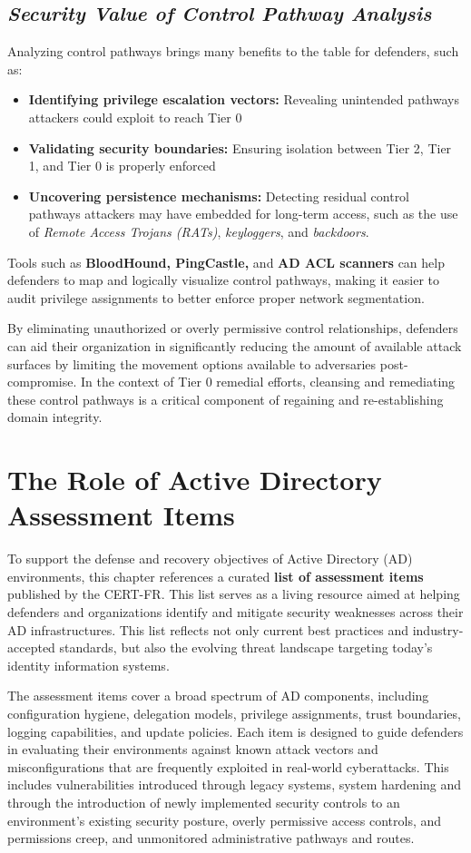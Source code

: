 \subsection{\textit{Security Value of Control Pathway Analysis}}
Analyzing control pathways brings many benefits to the table for defenders, such as:
\begin{itemize}
    \item \textbf{Identifying privilege escalation vectors:} Revealing unintended pathways attackers could exploit to reach Tier 0
        \item \textbf{Validating security boundaries:} Ensuring isolation between Tier 2, Tier 1, and Tier 0 is properly enforced
        \item \textbf{Uncovering persistence mechanisms:} Detecting residual control pathways attackers may have embedded for long-term access, such as the use of \textit{Remote Access Trojans (RATs)}, \textit{keyloggers}, and \textit{backdoors}.
\end{itemize}

Tools such as \textbf{BloodHound, PingCastle,} and \textbf{AD ACL scanners} can help defenders to map and logically visualize control pathways, making it easier to audit privilege assignments to better enforce proper network segmentation.

By eliminating unauthorized or overly permissive control relationships, defenders can aid their organization in significantly reducing the amount of available attack surfaces by limiting the movement options available to adversaries post-compromise. In the context of Tier 0 remedial efforts, cleansing and remediating these control pathways is a critical component of regaining and re-establishing domain integrity.

\section{The Role of Active Directory Assessment Items}
To support the defense and recovery objectives of Active Directory (AD) environments, this chapter references a curated \textbf{list of assessment items} published by the CERT-FR. This list serves as a living resource aimed at helping defenders and organizations identify and mitigate security weaknesses across their AD infrastructures. This list reflects not only current best practices and industry-accepted standards, but also the evolving threat landscape targeting today's identity information systems.

The assessment items cover a broad spectrum of AD components, including configuration hygiene, delegation models, privilege assignments, trust boundaries, logging capabilities, and update policies. Each item is designed to guide defenders in evaluating their environments against known attack vectors and misconfigurations that are frequently exploited in real-world cyberattacks. This includes vulnerabilities introduced through legacy systems, system hardening and through the introduction of newly implemented security controls to an environment's existing security posture, overly permissive access controls, and permissions creep, and unmonitored administrative pathways and routes.

